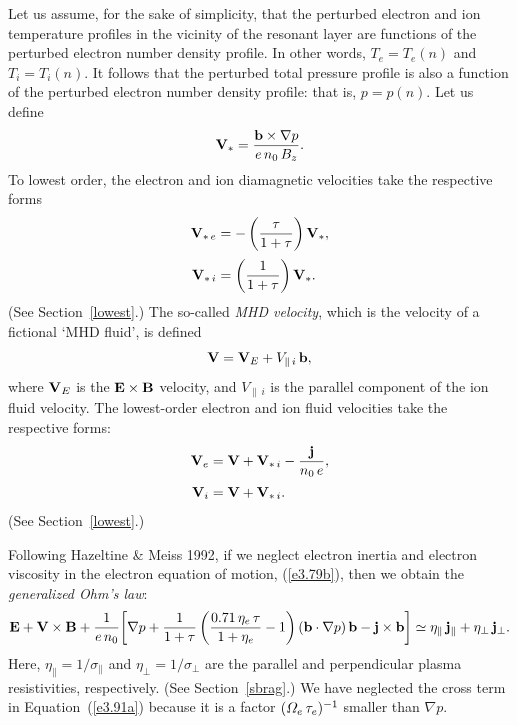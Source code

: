\documentclass[notitlepage,12pt]{article}
\begin{document}
Let us assume, for the sake of simplicity, that the perturbed electron and ion temperature profiles in the vicinity of the resonant
layer are functions of the perturbed electron number density profile. In other words, $T_e=T_e(n)$ and $T_i=T_i(n)$. 
It follows that the perturbed total pressure profile is also a function of the perturbed electron number density profile: that is,
$p=p(n)$. Let us define
\begin{equation}
{\bf V}_\ast = \frac{{\bf b}\times \nabla p}{e\,n_0\,B_z}.
\end{equation}
To lowest order, the electron and ion diamagnetic velocities take the respective forms
\begin{align}
{\bf V}_{\ast\,e} &= -\left(\frac{\tau}{1+\tau}\right){\bf V}_\ast,\\[0.5ex]
{\bf V}_{\ast\,i} &= \left(\frac{1}{1+\tau}\right){\bf V}_\ast.
\end{align}
(See Section~\ref{lowest}.)
The so-called {\em MHD velocity}, which is the velocity of a fictional `MHD fluid',  is defined
\begin{equation}\label{e217}
{\bf V} = {\bf V}_E + V_{\parallel\,i}\,{\bf b},
\end{equation}
where ${\bf V}_E$ is the ${\bf E}\times {\bf B}$ velocity, and $V_{\parallel\,i}$ is the parallel component of the ion
fluid velocity. The lowest-order electron and ion fluid velocities take the respective forms:
\begin{align}
{\bf V}_e &= {\bf V} +{\bf V}_{\ast\,i}-\frac{{\bf j}}{n_0\,e},\\[0.5ex]
{\bf V}_i &= {\bf V} + {\bf V}_{\ast\,i}.
\end{align}
(See Section~\ref{lowest}.)

Following Hazeltine \& Meiss 1992, if we neglect electron inertia and electron viscosity  in the electron equation of motion, (\ref{e3.79b}), then
we obtain the {\em generalized Ohm's law}: 
\begin{equation}\label{e220}
{\bf E} + {\bf V}\times {\bf B} + \frac{1}{e\,n_0}\!\left[\nabla p + \frac{1}{1+\tau}\left(\frac{0.71\,\eta_e\,\tau}{1+\eta_e}-1\right)({\bf b}\cdot\nabla p)\,{\bf b} -{\bf j}\times{\bf b}\right] \simeq \eta_\parallel\,{\bf j}_\parallel + \eta_\perp\,{\bf j}_\perp.
\end{equation}
Here, $\eta_\parallel=1/\sigma_\parallel$ and $\eta_\perp=1/\sigma_\perp$ are the parallel and perpendicular plasma
resistivities,  respectively. (See Section~\ref{sbrag}.) We have neglected the cross term in Equation~(\ref{e3.91a})
because it is a factor $({\mit\Omega}_e\,\tau_e)^{-1}$  smaller than $\nabla p$. 
\end{document}
